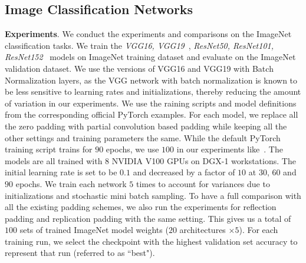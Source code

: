 \documentclass[10pt,twocolumn,letterpaper]{article}
\begin{document}
\begin{table*}
\begin{tabular}{c|ccccc|ccc}
    \end{tabular}
    \caption{The mean of last 5 epochs' top-1 accuracy ($\%$) for each run with 1-crop testing. *\_zero, *\_partial, *\_ref and *\_rep indicate the corresponding model with zero padding, partial convolution based padding, reflection padding and replication padding respectively. *\_last5 means the mean validation score of the last 5 epochs' model checkpoints for each run of the training. Column average represents the average accuracy of the 5 runs. Column diff represents the difference with corresponding network using zero padding. Column stdev represents the standard deviation of the accuracies from 5 runs.}
    \label{tab:avg}
\end{table*}\subsection{Image Classification Networks}\textbf{Experiments}. We conduct the experiments and comparisons on the ImageNet classification tasks. We train the \textit{VGG16, VGG19}~\cite{simonyan2014very}, \textit{ResNet50, ResNet101, ResNet152}~\cite{he2016deep} models on ImageNet training dataset and evaluate on the ImageNet validation dataset. We use the versions of VGG16 and VGG19 with Batch Normalization layers, as the VGG network with batch normalization is known to be less sensitive to learning rates and initializations, thereby reducing the amount of variation in our experiments. We use the raining scripts and model definitions from the corresponding official PyTorch examples. For each model, we replace all the zero padding with partial convolution based padding while keeping all the other settings and training parameters the same. While the default PyTorch training script trains for $90$ epochs, we use $100$ in our experiments like~\cite{wu2018group}. The models are all trained with $8$ NVIDIA V100 GPUs on DGX-1 workstations. The initial learning rate is set to be $0.1$ and decreased by a factor of $10$ at $30$, $60$ and $90$ epochs. We train each network $5$ times to account for variances due to initializations and stochastic mini batch sampling. To have a full comparison with all the existing padding schemes, we also run the experiments for reflection padding and replication padding with the same setting. This gives us a total of $100$ sets of trained ImageNet model weights ($20$ architectures $\times$$5$). For each training run, we select the checkpoint with the highest validation set accuracy to represent that run (referred to as ``best"). 
\end{document}

